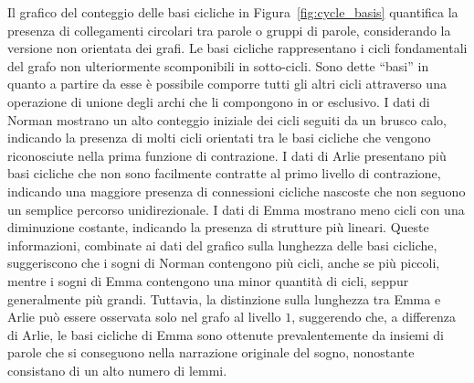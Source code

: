 Il grafico del conteggio delle basi cicliche in Figura~\ref{fig:cycle_basis} quantifica la presenza di collegamenti
circolari tra parole o gruppi di parole, considerando la versione non orientata dei grafi.
Le basi cicliche rappresentano i cicli fondamentali del grafo non ulteriormente scomponibili in sotto-cicli.
Sono dette ``basi'' in quanto a partire da esse è possibile comporre tutti gli altri cicli attraverso una operazione di
unione degli archi che li compongono in or esclusivo.
I dati di Norman mostrano un alto conteggio iniziale dei cicli seguiti da un brusco calo, indicando la presenza di molti
cicli orientati tra le basi cicliche che vengono riconosciute nella prima funzione di contrazione.
I dati di Arlie presentano più basi cicliche che non sono facilmente contratte al primo livello di contrazione,
indicando una maggiore presenza di connessioni cicliche nascoste che non seguono un semplice percorso unidirezionale.
I dati di Emma mostrano meno cicli con una diminuzione costante, indicando la presenza di strutture più lineari.
Queste informazioni, combinate ai dati del grafico sulla lunghezza delle basi cicliche, suggeriscono che i sogni di
Norman contengono più cicli, anche se più piccoli, mentre i sogni di Emma contengono una minor quantità di cicli,
seppur generalmente più grandi.
Tuttavia, la distinzione sulla lunghezza tra Emma e Arlie può essere osservata solo nel grafo al livello $1$, suggerendo
che, a differenza di Arlie, le basi cicliche di Emma sono ottenute prevalentemente da insiemi di parole che si
conseguono nella narrazione originale del sogno, nonostante consistano di un alto numero di lemmi.

